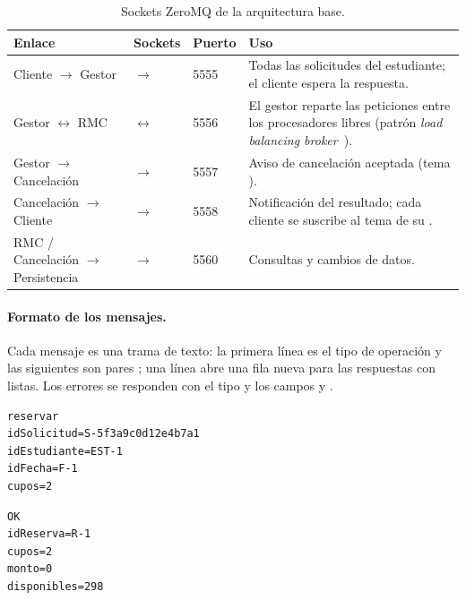 \begin{table}[H]
\centering
\caption{Sockets ZeroMQ de la arquitectura base.}
\label{tab:sockets}
\begin{tabularx}{\textwidth}{p{3.5cm}p{3.2cm}p{1.2cm}Y}
\toprule
Enlace & Sockets & Puerto & Uso \\
\midrule
Cliente $\rightarrow$ Gestor &  $\rightarrow$  & 5555 &
Todas las solicitudes del estudiante; el cliente espera la respuesta. \\
Gestor $\leftrightarrow$ RMC &  $\leftrightarrow$  & 5556 &
El gestor reparte las peticiones entre los procesadores libres (patrón
\emph{load balancing broker}~\cite{zguide}). \\
Gestor $\rightarrow$ Cancelación &  $\rightarrow$  & 5557 &
Aviso de cancelación aceptada (tema ). \\
Cancelación $\rightarrow$ Cliente &  $\rightarrow$  & 5558 &
Notificación del resultado; cada cliente se suscribe al tema de su
. \\
RMC / Cancelación $\rightarrow$ Persistencia &  $\rightarrow$  & 5560 &
Consultas y cambios de datos. \\
\bottomrule
\end{tabularx}
\end{table}

\paragraph{Formato de los mensajes.} Cada mensaje es una trama de texto: la primera
línea es el tipo de operación y las siguientes son pares ; una
línea \codigo{--} abre una fila nueva para las respuestas con listas. Los errores
se responden con el tipo  y los campos  y
.

\begin{minipage}[t]{0.47\textwidth}
\begin{lstlisting}[title={Petición}]
reservar
idSolicitud=S-5f3a9c0d12e4b7a1
idEstudiante=EST-1
idFecha=F-1
cupos=2
\end{lstlisting}
\end{minipage}\hfill
\begin{minipage}[t]{0.47\textwidth}
\begin{lstlisting}[title={Respuesta}]
OK
idReserva=R-1
cupos=2
monto=0
disponibles=298
\end{lstlisting}
\end{minipage}


